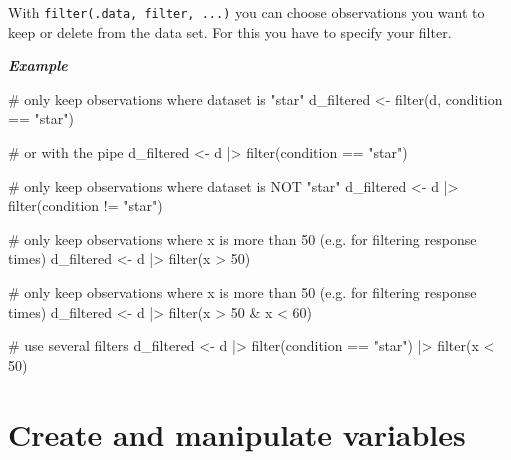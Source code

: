\documentclass[
  letterpaper,
  DIV=11,
  numbers=noendperiod]{scrreprt}
\newenvironment{Shaded}{\begin{snugshade}}{\end{snugshade}}
\newcommand{\CommentTok}[1]{\textcolor[rgb]{0.37,0.37,0.37}{#1}}
\newcommand{\DecValTok}[1]{\textcolor[rgb]{0.68,0.00,0.00}{#1}}
\newcommand{\FunctionTok}[1]{\textcolor[rgb]{0.28,0.35,0.67}{#1}}
\newcommand{\NormalTok}[1]{\textcolor[rgb]{0.00,0.23,0.31}{#1}}
\newcommand{\OtherTok}[1]{\textcolor[rgb]{0.00,0.23,0.31}{#1}}
\newcommand{\SpecialCharTok}[1]{\textcolor[rgb]{0.37,0.37,0.37}{#1}}
\newcommand{\StringTok}[1]{\textcolor[rgb]{0.13,0.47,0.30}{#1}}
\begin{document}
With \texttt{filter(.data,\ filter,\ ...)} you can choose observations
you want to keep or delete from the data set. For this you have to
specify your filter.

\textbf{\emph{Example}}

\begin{Shaded}
\begin{Highlighting}[]
\CommentTok{\# only keep observations where dataset is "star"}
\NormalTok{d\_filtered }\OtherTok{\textless{}{-}} \FunctionTok{filter}\NormalTok{(d, condition }\SpecialCharTok{==} \StringTok{"star"}\NormalTok{)}

\CommentTok{\# or with the pipe}
\NormalTok{d\_filtered }\OtherTok{\textless{}{-}}\NormalTok{ d }\SpecialCharTok{|\textgreater{}} \FunctionTok{filter}\NormalTok{(condition }\SpecialCharTok{==} \StringTok{"star"}\NormalTok{)}

\CommentTok{\# only keep observations where dataset is NOT "star"}
\NormalTok{d\_filtered }\OtherTok{\textless{}{-}}\NormalTok{ d }\SpecialCharTok{|\textgreater{}} \FunctionTok{filter}\NormalTok{(condition }\SpecialCharTok{!=} \StringTok{"star"}\NormalTok{)}

\CommentTok{\# only keep observations where x is more than 50 (e.g. for filtering response times)}
\NormalTok{d\_filtered }\OtherTok{\textless{}{-}}\NormalTok{ d }\SpecialCharTok{|\textgreater{}} \FunctionTok{filter}\NormalTok{(x }\SpecialCharTok{\textgreater{}} \DecValTok{50}\NormalTok{)}

\CommentTok{\# only keep observations where x is more than 50 (e.g. for filtering response times)}
\NormalTok{d\_filtered }\OtherTok{\textless{}{-}}\NormalTok{ d }\SpecialCharTok{|\textgreater{}} \FunctionTok{filter}\NormalTok{(x }\SpecialCharTok{\textgreater{}} \DecValTok{50} \SpecialCharTok{\&}\NormalTok{ x }\SpecialCharTok{\textless{}} \DecValTok{60}\NormalTok{)}

\CommentTok{\# use several filters}
\NormalTok{d\_filtered }\OtherTok{\textless{}{-}}\NormalTok{ d }\SpecialCharTok{|\textgreater{}} 
    \FunctionTok{filter}\NormalTok{(condition }\SpecialCharTok{==} \StringTok{"star"}\NormalTok{) }\SpecialCharTok{|\textgreater{}}
    \FunctionTok{filter}\NormalTok{(x }\SpecialCharTok{\textless{}} \DecValTok{50}\NormalTok{)}
\end{Highlighting}
\end{Shaded}

\hypertarget{create-and-manipulate-variables}{%
\section{Create and manipulate
variables}\label{create-and-manipulate-variables}}
\end{document}
